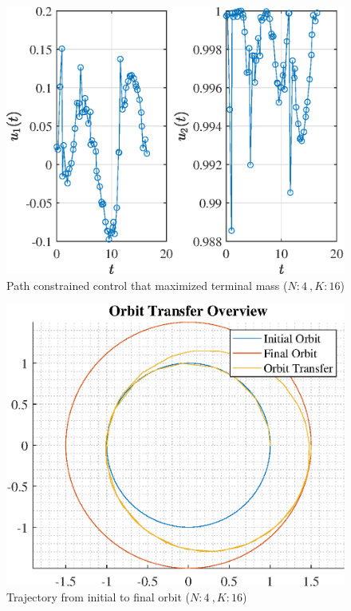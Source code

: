 \documentclass[]{article}
\begin{document}
\begin{figure}
	\centering
	\includegraphics[scale=0.75]{path_N4_K16_C3_mf.eps}
	\caption{Path constrained control that maximized terminal mass (\(N:4\ , K:16\))}
	\label{fig:path_N4_K16_C3_mf}
\end{figure}
\begin{figure}
	\centering
	\includegraphics[scale=0.75]{orbit_N4_K16_C3_mf.eps}
	\caption{Trajectory from initial to final orbit (\(N:4\ , K:16\))}
	\label{fig:orbit_N4_K16_C3_mf}
\end{figure}
\end{document}
